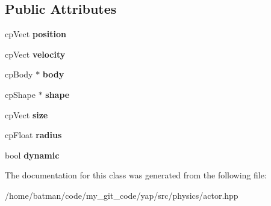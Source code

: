 \subsection*{Public Attributes}
\begin{DoxyCompactItemize}
\item 
\hypertarget{classActor_af6ad7b874a6cef5291367e149d7683c4}{}cp\+Vect {\bfseries position}\label{classActor_af6ad7b874a6cef5291367e149d7683c4}

\item 
\hypertarget{classActor_aec6e9e96e6edf0f712394ed1596a65a6}{}cp\+Vect {\bfseries velocity}\label{classActor_aec6e9e96e6edf0f712394ed1596a65a6}

\item 
\hypertarget{classActor_a85abf21455f366fdc4ed38288bbcc9b2}{}cp\+Body $\ast$ {\bfseries body}\label{classActor_a85abf21455f366fdc4ed38288bbcc9b2}

\item 
\hypertarget{classActor_a80dd1c1a1ebba5b41082ac00ff1af131}{}cp\+Shape $\ast$ {\bfseries shape}\label{classActor_a80dd1c1a1ebba5b41082ac00ff1af131}

\item 
\hypertarget{classActor_a886708bf688a5253b1fc8191b630c0ae}{}cp\+Vect {\bfseries size}\label{classActor_a886708bf688a5253b1fc8191b630c0ae}

\item 
\hypertarget{classActor_aadf37d2c3d3123cc9b60f79e0fe11530}{}cp\+Float {\bfseries radius}\label{classActor_aadf37d2c3d3123cc9b60f79e0fe11530}

\item 
\hypertarget{classActor_a7cf3ec4b52eb243377cdcdc3908f6deb}{}bool {\bfseries dynamic}\label{classActor_a7cf3ec4b52eb243377cdcdc3908f6deb}

\end{DoxyCompactItemize}


The documentation for this class was generated from the following file\+:\begin{DoxyCompactItemize}
\item 
/home/batman/code/my\+\_\+git\+\_\+code/yap/src/physics/actor.\+hpp\end{DoxyCompactItemize}
